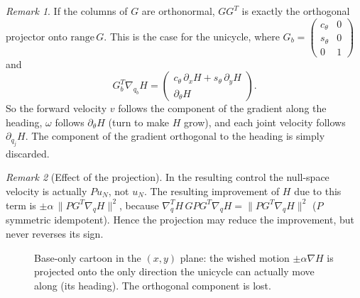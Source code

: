 \documentclass[11pt,a4paper]{article}
\def\bm#1{#1}%
\newcommand{\qbase}{\bm{q}_b}
\newcommand{\Gbase}{\bm{G}_b}
\newcommand{\grad}{\nabla_{\!\bm{q}}}
\theoremstyle{definition}
\theoremstyle{plain}
\theoremstyle{remark}
\newtheorem*{remark}{Remark}
\begin{document}
\begin{remark}
If the columns of $\bm G$ are orthonormal, $\bm G\bm G^T$ is exactly the orthogonal projector onto $\mathrm{range}\,\bm G$. This is the case for the unicycle, where $\Gbase=\begin{pmatrix}c_\theta&0\\ s_\theta&0\\0&1\end{pmatrix}$ and
\[
\Gbase^T\nabla_{\qbase}H=\begin{pmatrix}c_\theta\,\partial_xH+s_\theta\,\partial_yH\\ \partial_\theta H\end{pmatrix}.
\]
So the forward velocity $v$ follows the component of the gradient along the heading, $\omega$ follows $\partial_\theta H$ (turn to make $H$ grow), and each joint velocity follows $\partial_{q_j}H$. The component of the gradient orthogonal to the heading is simply discarded.
\end{remark}

\begin{remark}[Effect of the projection]
In the resulting control the null-space velocity is actually $\bm P\bm u_N$, not $\bm u_N$. The resulting improvement of $H$ due to this term is $\pm\alpha\,\|\bm P\bm G^T\grad H\|^2$, because $\grad^{\!T}H\,\bm G\bm P\bm G^T\grad H=\|\bm P\bm G^T\grad H\|^2$ ($\bm P$ symmetric idempotent). Hence the projection may reduce the improvement, but never reverses its sign.
\end{remark}

\begin{figure}[ht]
\centering
{}
\caption{Base-only cartoon in the $(x,y)$ plane: the wished motion $\pm\alpha\nabla H$ is projected onto the only direction the unicycle can actually move along (its heading). The orthogonal component is lost.}
\end{figure}
\end{document}
